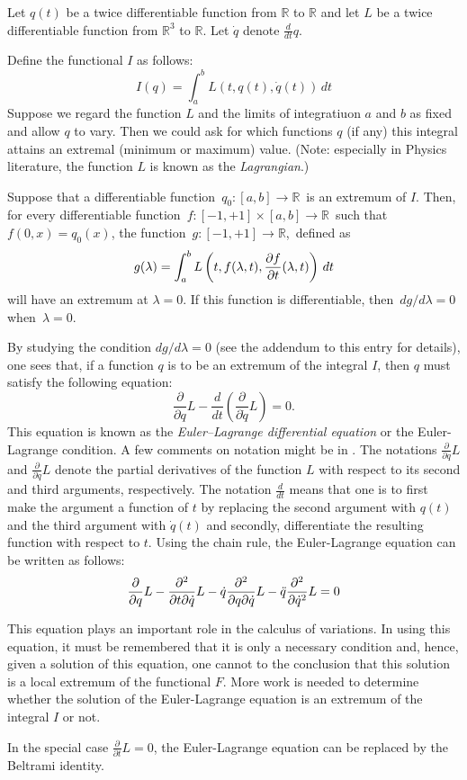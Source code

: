 \documentclass[12pt]{article}
\newcommand{\md}{d}
\newcommand{\mderiv}[1]{\frac{\md}{\md {#1}}} %
\newcommand{\mpderiv}[1]{\frac{\partial}{\partial {#1}}} %
\newcommand{\reals}{\mathbb{R}}
\begin{document}
Let $q(t)$ be a twice differentiable function from $\reals$ to $\reals$ and let $L$ be a twice differentiable function from $\reals^3$ to $\reals$.  Let
$\dot{q}$ denote $\mderiv{t}{q}$.

Define the functional $I$ as follows:
 $$I(q) = \int_a^b L (t, q(t), \dot{q}(t)) \, dt$$
Suppose we regard the function $L$ and the limits of integratiuon $a$ and $b$
as fixed and allow $q$ to vary.  Then we could ask for which functions $q$ (if any) this integral attains an extremal (minimum or maximum) value.  (Note: especially in Physics literature, the function $L$ is known as the \emph{Lagrangian}.)

Suppose that a differentiable function \,$q_0\!: [a,b] \to \reals$\, is an extremum of $I$.  Then, for every differentiable function \,$f \colon [-1,+1] \times [a,b] \to \reals$\, such that\, $f(0,x) = q_0 (x)$, the function 
\,$g \colon [-1, +1] \to \reals$,\, defined as
 $$g (\lambda) = \int_a^b L \left( t, f(\lambda, t), {\partial f \over \partial t} (\lambda, t) \right) \, dt$$
will have an extremum at $\lambda = 0$.  If this function is differentiable, then\, $dg/d\lambda = 0$\, when \,$\lambda = 0$. 

By studying the condition $dg/d\lambda = 0$ (see the addendum to this entry for details), one sees that, if a function $q$ is to be an extremum of the integral $I$, then $q$ must satisfy the following equation:
\begin{equation}
\mpderiv{q} L - \mderiv{t} \left( \mpderiv{\dot{q}} L \right) = 0.
\end{equation}
This equation is known as the \emph{Euler--Lagrange differential equation} or  the Euler-Lagrange condition.  A few comments on notation might be in .  The notations $\mpderiv{q} L$ and $\mpderiv{\dot{q}} L$ denote the partial derivatives of the function $L$ with respect to its second and third arguments, respectively.  The notation $\mderiv{t}$ means that one is to first make the argument a function of $t$ by replacing the second argument with $q(t)$ and the third argument with $\dot{q}(t)$ and secondly, differentiate the resulting function with respect to $t$.  Using the chain rule, the Euler-Lagrange equation can be written as follows:
\begin{equation}
\mpderiv{q} L - {\partial^2 \over \partial t \partial \dot{q}} L - \dot{q} {\partial^2 \over \partial q \partial \dot{q}} L - \ddot{q} {\partial^2 \over  \partial \dot{q}^2} L = 0
\end{equation}

This equation plays an important role in the calculus of variations.  In using this equation, it must be remembered that it is only a necessary condition and, hence, given a solution of this equation, one cannot  to the conclusion that this solution is a local extremum of the functional $F$.  More work is needed to determine whether the solution of the Euler-Lagrange equation is an extremum of the integral $I$ or not.

In the special case $\mpderiv{t} L = 0$, the Euler-Lagrange equation can be replaced by the Beltrami identity.
\end{document}
